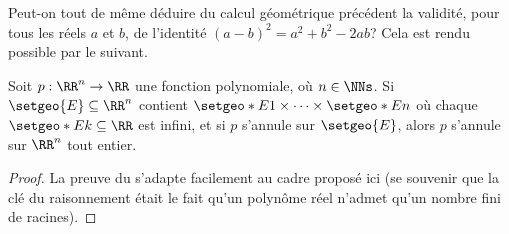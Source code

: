 Peut-on tout de même déduire du calcul géométrique précédent la validité, pour tous les réels $a$ et $b$, de l'identité $(a - b)^2 = a^2 + b^2 - 2ab$?
Cela est rendu possible par le  suivant. 


\medskip

\begin{fact} \label{poly-nullity-interval}
	Soit $p: \RR^n \rightarrow \RR$ une fonction polynomiale, où $n \in \NNs$.
	Si $\setgeo{E} \subseteq \RR^n$ contient $\setgeo*{E}{1} \times \cdots \times \setgeo*{E}{n}$ où chaque $\setgeo*{E}{k} \subseteq \RR$ est infini,
	et si $p$ s'annule sur $\setgeo{E}$,
	alors $p$ s'annule sur $\RR^n$ tout entier. 
\end{fact}


\begin{proof}
	La preuve du  s'adapte facilement au cadre proposé ici (se souvenir que la clé du raisonnement était le fait qu'un polynôme réel n'admet qu'un nombre fini de racines).
\end{proof}




\medskip

